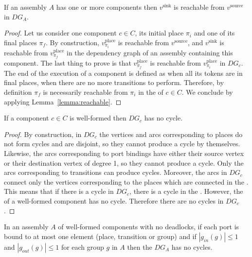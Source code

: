 \begin{lemma}
 If an assembly $A$ has one or more components then $v^\text{sink}$ is
 reachable from $v^\text{source}$ in $DG_A$.
 \label{lemma:source_sink}
\end{lemma}

\begin{proof}
 Let us consider one component $c \in C$, its initial place $\pi_i$ and one of
 its final places $\pi_f$. By construction, $v_{\pi_i}^\text{place}$ is
 reachable from $v^\text{source}$, and $v^\text{sink}$ is reachable from
 $v_{\pi_f}^\text{place}$ in the dependency graph of an assembly containing this
 component. The last thing to prove is that $v_{\pi_f}^\text{place}$ is reachable
 from $v_{\pi_i}^\text{place}$ in $DG_c$.
 The end of the execution of a \mad component is defined as
 when all its tokens are in final places, \ie when there are no more
 transitions to perform. Therefore, by definition $\pi_f$ is
 necessarily reachable from $\pi_i$ in the \net of $c \in C$.
 We conclude by applying Lemma~\ref{lemma:reachable}.
\end{proof}

\begin{lemma}
 If a component $c \in C$ is well-formed then $DG_c$ has no cycle.
 \label{lemma:no_cycles_component}
\end{lemma}

\begin{proof}
 By construction, in $DG_c$ the vertices and arcs corresponding to places do
 not form cycles and are disjoint, so they cannot produce a cycle by themselves.
 Likewise, the arcs corresponding to port bindings have either their source
 vertex or their destination vertex of degree 1, so they cannot produce a cycle.
 Only the arcs corresponding to transitions can produce cycles. Moreover, the
 arcs in $DG_c$ connect only the vertices corresponding to the places which
 are connected in the \net. This means that if there is a cycle in $DG_c$,
 there is a cycle in the \net. However, the \net of a well-formed \mad component
 has no cycle. Therefore there are no cycles in $DG_c$.
\end{proof}

\begin{lemma}
 In an assembly $A$ of well-formed components with no deadlocks, if each port
 is bound to at most one element (place, transition or group) and if
 $\left|g_{in}(g)\right|\leq 1$ and $\left|g_{out}(g)\right|\leq 1$ for each group
 $g$ in $A$ then the $DG_A$ has no cycles.
 \label{lemma:no_cycles_assembly}
\end{lemma}

